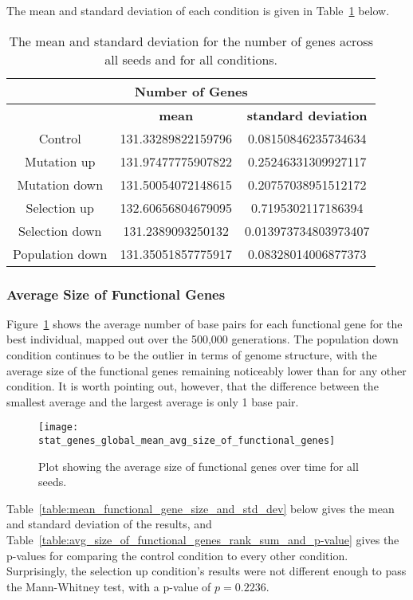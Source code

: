 The mean and standard deviation of each condition is given in Table~\ref{table:number_of_genes_mean_std_dev} below.

\begin{table}[H]
	\centering
	\begin{tabular}{|c|c|c|}
		\hline
		\multicolumn{3}{|c|}{\Large \textbf{Number of Genes}} \\
		\hline
		 & \textbf{mean} & \textbf{standard deviation} \\
		\hline
		Control & 131.33289822159796 & 0.08150846235734634 \\
		\hline
		Mutation up & 131.97477775907822 & 0.25246331309927117 \\
		\hline
		Mutation down & 131.50054072148615 & 0.20757038951512172 \\
		\hline
		Selection up & 132.60656804679095 & 0.7195302117186394 \\ 
		\hline
		Selection down & 131.2389093250132 & 0.013973734803973407 \\
		\hline
		Population down & 131.35051857775917 & 0.08328014006877373 \\
		\hline
	\end{tabular}
	\caption[Number of genes - mean and standard deviation]{The mean and standard deviation for the number of genes across all seeds and for all conditions.}
	\label{table:number_of_genes_mean_std_dev}
\end{table}

\subsubsection{Average Size of Functional Genes}\label{sec:average_size_functional_genes}
Figure~\ref{fig:mean_functional_gene_size} shows the average number of base pairs for each functional gene for the best individual, mapped out over the 500,000 generations. The population down condition continues to be the outlier in terms of genome structure, with the average size of the functional genes remaining noticeably lower than for any other condition. It is worth pointing out, however, that the difference between the smallest average and the largest average is only 1 base pair. 
\begin{figure}[H]
	\centering
	\texttt{[image: stat\_genes\_global\_mean\_avg\_size\_of\_functional\_genes]}
	\caption[Average size of functional genes]{Plot showing the average size of functional genes over time for all seeds.}
	\label{fig:mean_functional_gene_size}
\end{figure}
Table~\ref{table:mean_functional_gene_size_and_std_dev} below gives the mean and standard deviation of the results, and Table~\ref{table:avg_size_of_functional_genes_rank_sum_and_p-value} gives the p-values for comparing the control condition to every other condition. Surprisingly, the selection up condition's results were not different enough to pass the Mann-Whitney test, with a p-value of $p = 0.2236$. 

